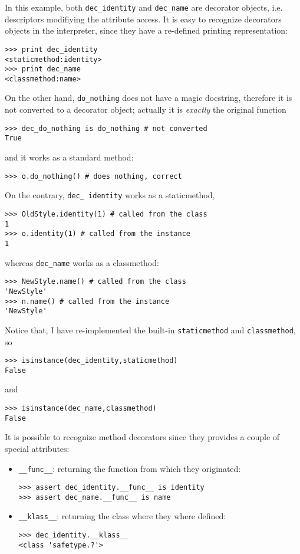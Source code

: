 \documentclass[11pt,english]{article}
\begin{document}
In this example, both \texttt{dec{\_}identity} and \texttt{dec{\_}name} are decorator objects,
i.e. descriptors modifiying the attribute access. It is easy to recognize
decorators objects in the interpreter, since they have a re-defined 
printing representation:
\begin{verbatim}>>> print dec_identity
<staticmethod:identity>
>>> print dec_name
<classmethod:name>\end{verbatim}

On the other hand, \texttt{do{\_}nothing} does not have a magic 
docstring, therefore it is not converted to a decorator object; 
actually it is \emph{exactly} the original function
\begin{verbatim}>>> dec_do_nothing is do_nothing # not converted
True\end{verbatim}

and it works as a standard method:
\begin{verbatim}>>> o.do_nothing() # does nothing, correct\end{verbatim}

On the contrary, \texttt{dec{\_} identity} works as a staticmethod,
\begin{verbatim}>>> OldStyle.identity(1) # called from the class
1
>>> o.identity(1) # called from the instance
1\end{verbatim}

whereas \texttt{dec{\_}name} works as a classmethod:
\begin{verbatim}>>> NewStyle.name() # called from the class
'NewStyle'
>>> n.name() # called from the instance
'NewStyle'\end{verbatim}

Notice that, I have re-implemented the built-in 
\texttt{staticmethod} and \texttt{classmethod}, so
\begin{verbatim}>>> isinstance(dec_identity,staticmethod)
False\end{verbatim}

and
\begin{verbatim}>>> isinstance(dec_name,classmethod)
False\end{verbatim}

It is possible to recognize method decorators since they provides 
a couple of special attributes:
\begin{itemize}
\item 
\texttt{{\_}{\_}func{\_}{\_}}: returning the function from which they originated:
\begin{verbatim}>>> assert dec_identity.__func__ is identity
>>> assert dec_name.__func__ is name\end{verbatim}

\item 
\texttt{{\_}{\_}klass{\_}{\_}}: returning the class where they where defined:
\begin{verbatim}>>> dec_identity.__klass__
<class 'safetype.?'>\end{verbatim}

\end{itemize}
\end{document}
